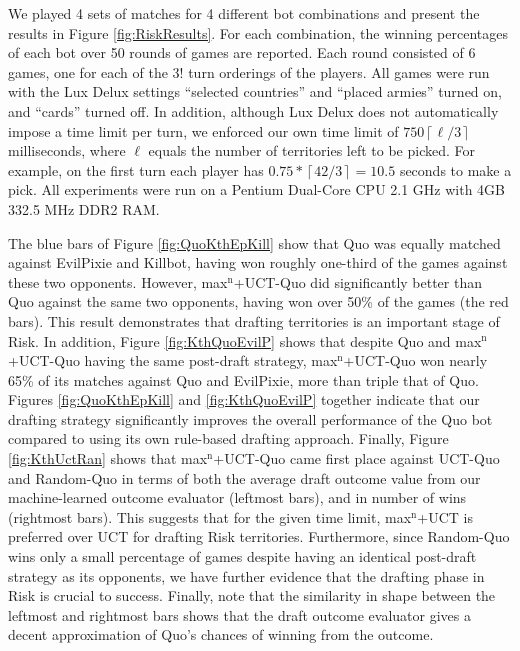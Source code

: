 \documentclass[letterpaper]{article}
\numberwithin{equation}{section}
\numberwithin{theorem}{section}
\numberwithin{lemma}{section}
\numberwithin{df}{section}
\begin{document}
We played 4 sets of matches for 4 different bot combinations and present the results in Figure \ref{fig:RiskResults}.  For each combination, the winning percentages of each bot over 50 rounds of games are reported.  Each round consisted of 6 games, one for each of the $3!$ turn orderings of the players.  All games were run with the Lux Delux settings ``selected countries'' and ``placed armies'' turned on, and ``cards'' turned off.  In addition, although Lux Delux does not automatically impose a time limit per turn, we enforced our own time limit of $750 \left \lceil \ell / 3 \right \rceil$ milliseconds, where $\ell$ equals the number of territories left to be picked.  For example, on the first turn each player has $0.75 * \left \lceil 42 / 3 \right \rceil = 10.5$ seconds to make a pick.  All experiments were run on a Pentium Dual-Core CPU 2.1 GHz with 4GB 332.5 MHz DDR2 RAM.  

The blue bars of Figure \ref{fig:QuoKthEpKill} show that Quo was equally matched against EvilPixie and Killbot, having won roughly one-third of the games against these two opponents.  However, max$^\text{n}$+UCT-Quo did significantly better than Quo against the same two opponents, having won over 50\% of the games (the red bars).  This result demonstrates that drafting territories is an important stage of Risk.  In addition, Figure \ref{fig:KthQuoEvilP} shows that despite Quo and max$^\text{n}$+UCT-Quo having the same post-draft strategy, max$^\text{n}$+UCT-Quo won nearly 65\% of its matches against Quo and EvilPixie, more than triple that of Quo.  Figures \ref{fig:QuoKthEpKill} and \ref{fig:KthQuoEvilP} together indicate that our drafting strategy significantly improves the overall performance of the Quo bot compared to using its own rule-based drafting approach.  Finally, Figure \ref{fig:KthUctRan} shows that max$^\text{n}$+UCT-Quo came first place against UCT-Quo and Random-Quo in terms of both the average draft outcome value from our machine-learned outcome evaluator (leftmost bars), and in number of wins (rightmost bars).  This suggests that for the given time limit, max$^\text{n}$+UCT is preferred over UCT for drafting Risk territories.  Furthermore, since Random-Quo wins only a small percentage of games despite having an identical post-draft strategy as its opponents, we have further evidence that the drafting phase in Risk is crucial to success.  Finally, note that the similarity in shape between the leftmost and rightmost bars shows that the draft outcome evaluator gives a decent approximation of Quo's chances of winning from the outcome.
\end{document}
